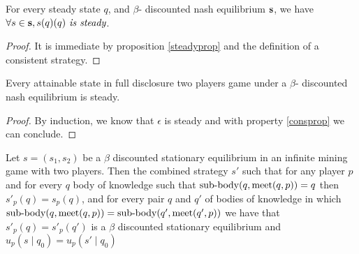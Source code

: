 \begin{myprop}
	\label{consprop}
	For every steady state $q$, and $\beta$- discounted nash equilibrium $\mathbf{s}$, we have $\forall s \in \mathbf{s}, s(q)(q) \textit{ is steady}$.
\end{myprop}
\begin{proof}
	It is immediate by proposition \ref{steadyprop} and the definition of a consistent strategy.
\end{proof}

\begin{myprop}
	Every attainable state in full disclosure two players game under a $\beta$- discounted nash equilibrium is steady.
\end{myprop}
\begin{proof}
	By induction, we know that $\epsilon$ is steady and with property \ref{consprop} we can conclude. 
\end{proof}


\fi
\begin{mylem}
	Let $s = (s_1,s_2)$ be a $\beta$ discounted stationary equilibrium in an infinite mining game with two players. 
	Then the combined strategy $s'$ such that for any player $p$  and for every $q$ body of knowledge such that ${\text{\rm sub-body}}(q,\text{\rm meet}(q,p)) = q$ then $s'_p(q) = s_p(q)$,
	and for every pair $q$ and $q'$ of 
	bodies of knowledge in which ${\text{\rm sub-body}}(q,\text{\rm meet}(q,p)) = {\text{\rm sub-body}}(q',\text{\rm meet}(q',p))$ we have that 
	$s'_p(q) = s'_p(q')$ is a $\beta$ discounted stationary equilibrium and $u_p(s \mid q_0) = u_p(s' \mid q_0)$
\end{mylem}

